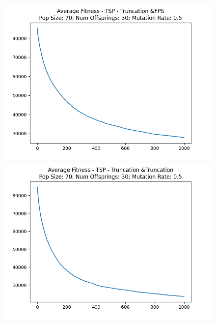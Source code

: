 \documentclass[12pt]{report}
\theoremstyle{mytheoremstyle}
\theoremstyle{mytheoremstyle}
\theoremstyle{myproblemstyle}
\begin{document}
\begin{figure}[!]
\begin{minipage}{0.4\textwidth}
		\includegraphics[width=\linewidth]{../Analysis/ASF_TSP_3_0_70_30.png}
	\end{minipage}
	\hspace{\fill}
	\begin{minipage}{0.4\textwidth}
		\includegraphics[width=\linewidth]{../Analysis/ASF_TSP_3_3_70_30.png}
	\end{minipage}
	\vspace*{1cm}
	\begin{minipage}{0.4\textwidth}

\end{minipage}
\end{figure}
\end{document}
